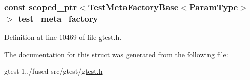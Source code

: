 \hypertarget{structtesting_1_1internal_1_1ParameterizedTestCaseInfo_1_1TestInfo_acbf484daea0af30a8b690b7291e606ec}{
\subsubsection[{test\-\_\-meta\-\_\-factory}]{\setlength{\rightskip}{0pt plus 5cm}const {\bf scoped\-\_\-ptr}$<${\bf \-Test\-Meta\-Factory\-Base}$<${\bf \-Param\-Type}$>$ $>$ {\bf test\-\_\-meta\-\_\-factory}}}\label{d1/d02/structtesting_1_1internal_1_1ParameterizedTestCaseInfo_1_1TestInfo_acbf484daea0af30a8b690b7291e606ec}


\-Definition at line 10469 of file gtest.\-h.



\-The documentation for this struct was generated from the following file\-:\begin{DoxyCompactItemize}
\item 
gtest-\/1../fused-\/src/gtest/\hyperlink{fused-src_2gtest_2gtest_8h}{gtest.\-h}\end{DoxyCompactItemize}
